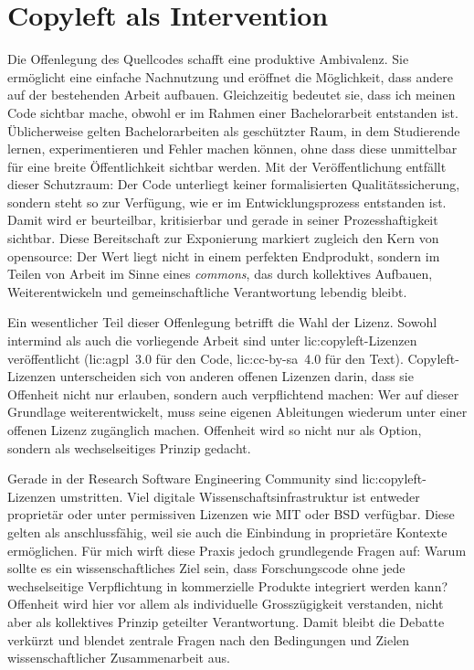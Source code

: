 \section{Copyleft als Intervention}

Die Offenlegung des Quellcodes schafft eine produktive Ambivalenz. Sie ermöglicht eine einfache Nachnutzung und eröffnet die Möglichkeit, dass andere auf der bestehenden Arbeit aufbauen. Gleichzeitig bedeutet sie, dass ich meinen Code sichtbar mache, obwohl er im Rahmen einer Bachelorarbeit entstanden ist. Üblicherweise gelten Bachelorarbeiten als geschützter Raum, in dem Studierende lernen, experimentieren und Fehler machen können, ohne dass diese unmittelbar für eine breite Öffentlichkeit sichtbar werden. Mit der Veröffentlichung entfällt dieser Schutzraum: Der Code unterliegt keiner formalisierten Qualitätssicherung, sondern steht so zur Verfügung, wie er im Entwicklungsprozess entstanden ist. Damit wird er beurteilbar, kritisierbar und gerade in seiner Prozesshaftigkeit sichtbar. Diese Bereitschaft zur Exponierung markiert zugleich den Kern von \gls{opensource}: Der Wert liegt nicht in einem perfekten Endprodukt, sondern im Teilen von Arbeit im Sinne eines \emph{commons}, das durch kollektives Aufbauen, Weiterentwickeln und gemeinschaftliche Verantwortung lebendig bleibt.

Ein wesentlicher Teil dieser Offenlegung betrifft die Wahl der Lizenz. Sowohl \gls{intermind} als auch die vorliegende Arbeit sind unter \gls{lic:copyleft}-Lizenzen veröffentlicht (\gls{lic:agpl}~3.0 für den Code, \gls{lic:cc-by-sa}~4.0 für den Text). Copyleft-Lizenzen unterscheiden sich von anderen offenen Lizenzen darin, dass sie Offenheit nicht nur erlauben, sondern auch verpflichtend machen: Wer auf dieser Grundlage weiterentwickelt, muss seine eigenen Ableitungen wiederum unter einer offenen Lizenz zugänglich machen. Offenheit wird so nicht nur als Option, sondern als wechselseitiges Prinzip gedacht. 

Gerade in der Research Software Engineering Community sind \gls{lic:copyleft}-Lizenzen umstritten. Viel digitale Wissenschaftsinfrastruktur ist entweder proprietär oder unter permissiven Lizenzen wie MIT oder BSD \parencite{sethiWhyEarthAre2020} verfügbar. Diese gelten als anschlussfähig, weil sie auch die Einbindung in proprietäre Kontexte ermöglichen. Für mich wirft diese Praxis jedoch grundlegende Fragen auf: Warum sollte es ein wissenschaftliches Ziel sein, dass Forschungscode ohne jede wechselseitige Verpflichtung in kommerzielle Produkte integriert werden kann? Offenheit wird hier vor allem als individuelle Grosszügigkeit verstanden, nicht aber als kollektives Prinzip geteilter Verantwortung. Damit bleibt die Debatte verkürzt und blendet zentrale Fragen nach den Bedingungen und Zielen wissenschaftlicher Zusammenarbeit aus.

